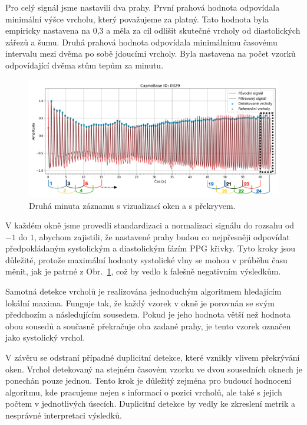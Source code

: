 Pro celý signál jsme nastavili dva prahy.
První prahová hodnota odpovídala minimální výšce vrcholu, který považujeme za platný.
Tato hodnota byla empiricky nastavena na 0,3 a měla za cíl odlišit skutečné vrcholy od diastolických zářezů a šumu.
Druhá prahová hodnota odpovídala minimálnímu časovému intervalu mezi dvěma po sobě jdoucími vrcholy.
Byla nastavena na počet vzorků odpovídající dvěma stům tepům za minutu.

\begin{figure} [h]
	\centering
	\includegraphics[width=1\textwidth]{./obrazky/My_peaks.png}
	\caption[Vlastní detekce vrcholů]{Druhá minuta záznamu s vizualizací oken a s překryvem.}
	\label{fig:my-detection}
\end{figure}

V každém okně jsme provedli standardizaci a normalizaci signálu do rozsahu od \(-1\) do \(1\), abychom zajistili, že nastavené prahy budou co nejpřesněji odpovídat předpokládaným systolickým a diastolickým fázím \acs{PPG} křivky.
Tyto kroky jsou důležité, protože maximální hodnoty systolické vlny se mohou v průběhu času měnit, jak je patrné z Obr.~\ref{fig:my-detection}, což by vedlo k falešně negativním výsledkům.

Samotná detekce vrcholů je realizována jednoduchým algoritmem hledajícím lokální maxima.
Funguje tak, že každý vzorek v okně je porovnán se svým předchozím a následujícím sousedem.
Pokud je jeho hodnota větší než hodnota obou sousedů a současně překračuje oba zadané prahy, je tento vzorek označen jako systolický vrchol.

V závěru se odstraní případné duplicitní detekce, které vznikly vlivem překrývání oken.
Vrchol detekovaný na stejném časovém vzorku ve dvou sousedních oknech je ponechán pouze jednou.
Tento krok je důležitý zejména pro budoucí hodnocení algoritmu, kde pracujeme nejen s informací o pozici vrcholů, ale také s jejich počtem v jednotlivých úsecích.
Duplicitní detekce by vedly ke zkreslení metrik a nesprávné interpretaci výsledků.

